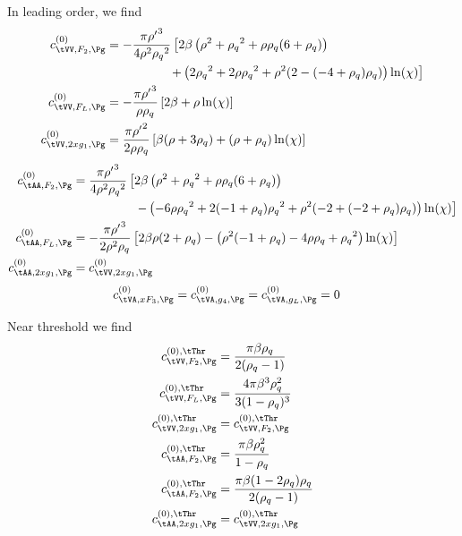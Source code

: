 In leading order, we find
\begin{align}
c^{(0)}_{\tVV,F_2,\Pg} &= -\frac{\pi {\rho'}^3 }{4 \rho ^2 {\rho_q}^2}\left[2\beta\left(\rho ^2+{\rho_q}^2+\rho  {\rho_q} (6+{\rho_q})\right) \right.\nonumber\\
 &\hspace{50pt}\left.+\left(2 {\rho_q}^2+2 \rho  {\rho_q}^2+\rho ^2 (2-(-4+{\rho_q}) {\rho_q})\right) \ln(\chi)\right]\\
c^{(0)}_{\tVV,F_L,\Pg} &= -\frac{\pi{\rho'}^3}{\rho\rho_q}\left[2\beta + \rho\ln(\chi)\right]\\
c^{(0)}_{\tVV,2xg_1,\Pg} &= \frac{\pi{\rho'}^2}{2\rho\rho_q}\left[\beta(\rho+3\rho_q) + (\rho+\rho_q)\ln(\chi)\right]
\end{align}
\begin{align}
c^{(0)}_{\tAA,F_2,\Pg} &= \frac{\pi {\rho'}^3}{4\rho^2{\rho_q}^2}\left[ 2\beta\left(\rho ^2+{\rho_q}^2+\rho  {\rho_q} (6+{\rho_q})\right) \right.\nonumber\\
 &\hspace{50pt} \left. - \left(-6 \rho  {\rho_q}^2+2 (-1+{\rho_q}) {\rho_q}^2+\rho ^2 (-2+(-2+{\rho_q}) {\rho_q})\right) \ln(\chi) \right] \\
c^{(0)}_{\tAA,F_L,\Pg} &=-\frac{\pi{\rho'}^3}{2\rho^2\rho_q}\left[2\beta\rho(2+\rho_q) - \left(\rho ^2 (-1+{\rho_q})-4 \rho  {\rho_q}+{\rho_q}^2\right) \ln(\chi)\right]\\
c^{(0)}_{\tAA,2xg_1,\Pg} &= c^{(0)}_{\tVV,2xg_1,\Pg}
\end{align}
\begin{align}
c^{(0)}_{\tVA,xF_3,\Pg} &= c^{(0)}_{\tVA,g_4,\Pg} = c^{(0)}_{\tVA,g_L,\Pg} = 0
\end{align}

Near threshold we find
\begin{align}
c^{(0),\tThr}_{\tVV,F_2,\Pg} &= \frac{\pi\beta\rho_q}{2(\rho_q-1)}\\
c^{(0),\tThr}_{\tVV,F_L,\Pg} &= \frac{4\pi\beta^3\rho_q^2}{3(1-\rho_q)^3}\\
c^{(0),\tThr}_{\tVV,2xg_1,\Pg} &= c^{(0),\tThr}_{\tVV,F_2,\Pg}\\
c^{(0),\tThr}_{\tAA,F_2,\Pg} &= \frac{\pi\beta\rho_q^2}{1-\rho_q}\\
c^{(0),\tThr}_{\tAA,F_2,\Pg} &= \frac{\pi\beta(1-2\rho_q)\rho_q}{2(\rho_q-1)}\\
c^{(0),\tThr}_{\tAA,2xg_1,\Pg} &= c^{(0),\tThr}_{\tVV,2xg_1,\Pg}
\end{align}

